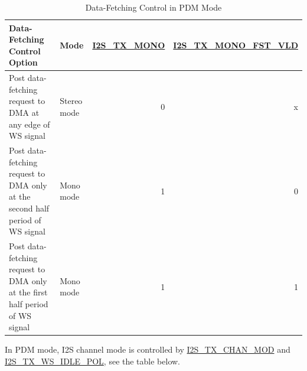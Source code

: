 \documentclass[main\_\_CN.tex]{subfiles}
\begin{document}
\begin{table}[H]
    \centering
    \caption{Data-Fetching Control in PDM Mode}
    \label{table:TX_PDM_DATA_READ}
    \begin{tabular}{|p{6.6cm}|l|r|r|}
    \hline
    \rowcolor{lightgray}
    \textbf{Data-Fetching Control Option} &\textbf{Mode} &\textbf{\hyperref[fielddesc:I2STXMONO]{I2S\_TX\_MONO}}  & \textbf{\hyperref[fielddesc:I2STXMONOFSTVLD]{I2S\_TX\_MONO\_FST\_VLD}} \\ \hline
                        Post data-fetching request to DMA at any edge of WS signal &Stereo mode  & 0  & x \\ \hline
                        Post data-fetching request to DMA only at the second half period of WS signal  & Mono mode  & 1 & 0   \\ \hline
                        Post data-fetching request to DMA only at the first half period of WS signal  & Mono mode  & 1 & 1   \\ \hline
    \end{tabular}
\end{table}
In PDM mode, I2S channel mode is controlled by  \hyperref[fielddesc:I2STXCHANMOD]{I2S\_TX\_CHAN\_MOD} and \hyperref[fielddesc:I2STXWSIDLEPOL]{I2S\_TX\_WS\_IDLE\_POL}, see the table below.
\end{document}
